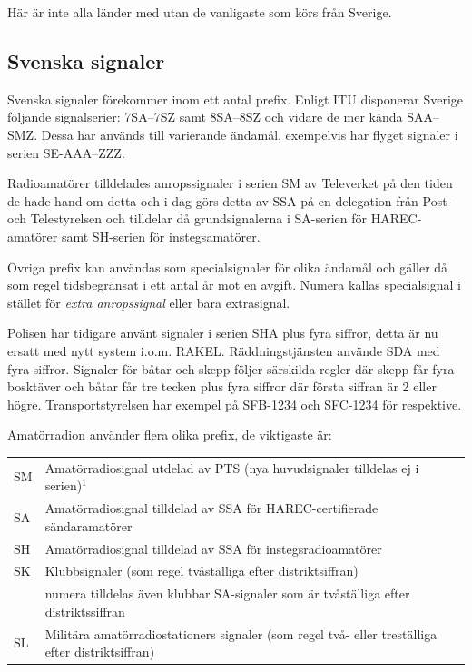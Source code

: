 Här är inte alla länder med utan de vanligaste som körs från Sverige.



\subsection{Svenska signaler}

Svenska signaler förekommer inom ett antal prefix. Enligt ITU disponerar
Sverige följande signalserier: 7SA--7SZ samt 8SA--8SZ och vidare de mer kända
SAA--SMZ. Dessa har används till varierande ändamål, exempelvis har flyget
signaler i serien SE-AAA--ZZZ.

Radioamatörer tilldelades anropssignaler i serien SM av Televerket på den tiden
de hade hand om detta och i dag görs detta av SSA på en delegation från Post-
och Telestyrelsen och tilldelar då grundsignalerna i SA-serien för HAREC-amatörer
samt SH-serien för instegsamatörer.

Övriga prefix kan användas som specialsignaler för olika ändamål och gäller då
som regel tidsbegränsat i ett antal år mot en avgift. Numera kallas specialsignal
i stället för {\it extra anropssignal} eller bara extrasignal.

Polisen har tidigare använt signaler i serien SHA plus fyra siffror, detta är
nu ersatt med nytt system i.o.m. RAKEL. Räddningstjänsten använde SDA med fyra
siffror. Signaler för båtar och skepp följer särskilda regler där skepp får fyra
bosktäver och båtar får tre tecken plus fyra siffror där första siffran är 2 eller
högre. Transportstyrelsen har exempel på SFB-1234 och SFC-1234 för respektive.

Amatörradion använder flera olika prefix, de viktigaste är:

\begin{tabular}{ll}
	SM & Amatörradiosignal utdelad av PTS (nya huvudsignaler tilldelas ej i serien)$^1$          \\
	SA & Amatörradiosignal tilldelad av SSA för HAREC-certifierade sändaramatörer                \\
	SH & Amatörradiosignal tilldelad av SSA för instegsradioamatörer                             \\
	SK & Klubbsignaler (som regel tvåställiga efter distriktsiffran)                             \\
	   & numera tilldelas även klubbar SA-signaler som är tvåställiga efter distriktssiffran     \\
	SL & Militära amatörradiostationers signaler (som regel två- eller treställiga efter distriktsiffran)
\end{tabular}

